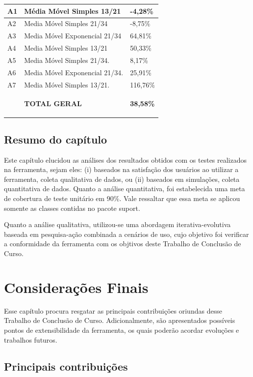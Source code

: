 \begin{description}
\begin{center}
\begin{longtable}{| p{2cm} | p{10cm} |p{2cm} |}
	A1 & Média Móvel Simples 13/21 & -4,28\% \\ \hline
	A2 & Media Móvel Simples 21/34 & -8,75\% \\ \hline
	A3 & Media Móvel Exponencial 21/34 & 64,81\% \\ \hline
	A4 & Media Móvel Simples  13/21 & 50,33\% \\ \hline
	A5 & Media Móvel Simples 21/34. & 8,17\% \\ \hline
	A6 & Media Móvel Exponencial 21/34. & 25,91\% \\ \hline
	A7 & Media Móvel Simples  13/21. & 116,76\% \\ \hline
	{} & \textbf{TOTAL GERAL} & \textbf{38,58\%} 
	
\label{t11}
\end{longtable}
\end{center} 
\end{description}

\section{Resumo do capítulo}

Este capítulo elucidou as análises dos resultados obtidos com os testes realizados na ferramenta, sejam eles: (i) baseados na satisfação dos usuários ao utilizar a ferramenta, coleta qualitativa de dados, ou (ii) baseados em simulações, coleta quantitativa de dados. Quanto a análise quantitativa, foi estabelecida uma meta de cobertura de teste unitário em 90\%. Vale ressaltar que essa meta se aplicou somente as classes contidas no pacote suport. 

Quanto a análise qualitativa, utilizou-se uma abordagem iterativa-evolutiva baseada em pesquisa-ação combinada a cenários de uso, cujo objetivo foi verificar a conformidade da ferramenta com os objtivos deste Trabalho de Conclusão de Curso.


\newpage
\chapter[CONSIDERAÇÕES FINAIS]{Considerações Finais}

Esse capítulo procura resgatar as principais contribuições oriundas desse Trabalho de Conclusão de Curso. Adicionalmente, são apresentados possíveis pontos de extensibilidade da ferramenta, os quais poderão acordar evoluções e trabalhos futuros.

\section{Principais contribuições}

